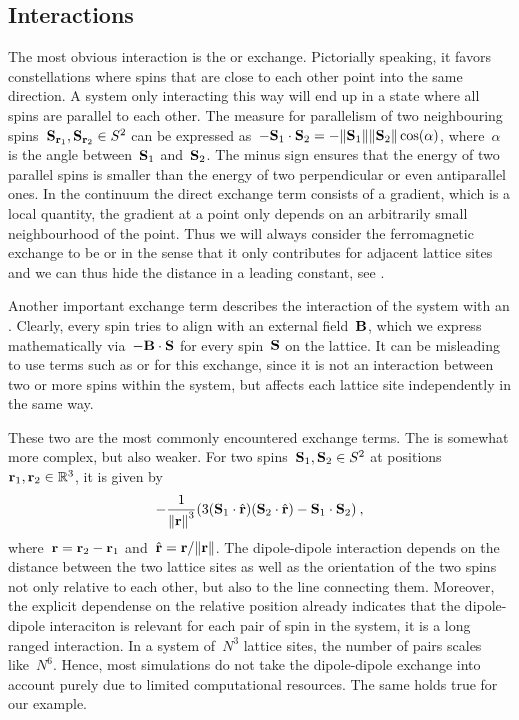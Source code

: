 \subsection{Interactions}

The most obvious interaction is the  or 
exchange.  Pictorially speaking, it favors constellations where spins that are
close to each other point into the same direction. A system only interacting
this way will end up in a state where all spins are parallel to each other. The
measure for parallelism of two neighbouring spins~$\S_{\r_1}, \S_{\r_2} \in S^2$
can be expressed as~$- \S_1 \cdot \S_2 = - \norm{\S_1} \norm{\S_2}
\cos(\alpha)$, where~$\alpha$ is the angle between~$\S_1$ and~$\S_2$. The minus
sign ensures that the energy of two parallel spins is smaller than the energy of
two perpendicular or even antiparallel ones. In the continuum the direct
exchange term consists of a gradient, which is a local quantity, \ie{} the
gradient at a point only depends on an arbitrarily small neighbourhood of the
point. Thus we will always consider the ferromagnetic exchange to be
 or  in the sense that it only contributes
for adjacent lattice sites and we can thus hide the distance in a leading
constant, see .

Another important exchange term describes the interaction of the system with an
. Clearly, every spin tries to align with an
external field~$\B$, which we express mathematically via~$-\B \cdot \S$ for
every spin~$\S$ on the lattice. It can be misleading to use terms such as
 or  for this exchange, since it is not
an interaction between two or more spins within the system, but affects each
lattice site independently in the same way.

These two are the most commonly encountered exchange terms. The
 is somewhat more complex, but also weaker.
For two spins~$\S_1, \S_2 \in S^2$ at positions~$\r_1, \r_2 \in \bR^3$, it is
given by
%
\begin{equation}
  - \frac{1}{\norm{\r}^3}
  (3 (\S_1 \cdot \hat{\r})(\S_2 \cdot \hat{\r}) - \S_1 \cdot \S_2)\:,
\end{equation}
%
where~$\r = \r_2 - \r_1$ and~$\hat{\r} = \r / \norm{\r}$. The dipole-dipole
interaction depends on the distance between the two lattice sites as well as the
orientation of the two spins not only relative to each other, but also to the
line connecting them. Moreover, the explicit dependense on the relative position
already indicates that the dipole-dipole interaciton is relevant for each pair
of spin in the system, it is a long ranged interaction. In a system of~$N^3$
lattice sites, the number of pairs scales like~$N^6$. Hence, most simulations do
not take the dipole-dipole exchange into account purely due to limited
computational resources. The same holds true for our example.

